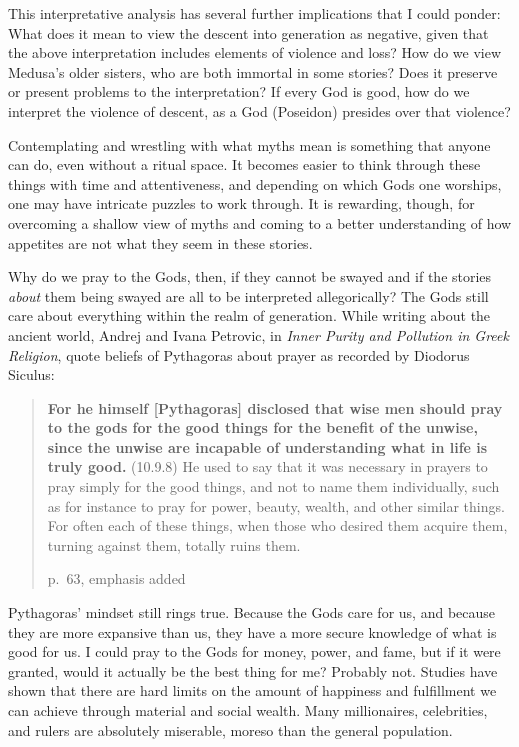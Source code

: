 \documentclass[
]{book}
\begin{document}
This interpretative analysis has several further implications that I could ponder: What does it mean to view the descent into generation as negative, given that the above interpretation includes elements of violence and loss? How do we view Medusa's older sisters, who are both immortal in some stories? Does it preserve or present problems to the interpretation? If every God is good, how do we interpret the violence of descent, as a God (Poseidon) presides over that violence?

Contemplating and wrestling with what myths mean is something that anyone can do, even without a ritual space. It becomes easier to think through these things with time and attentiveness, and depending on which Gods one worships, one may have intricate puzzles to work through. It is rewarding, though, for overcoming a shallow view of myths and coming to a better understanding of how appetites are not what they seem in these stories.

Why do we pray to the Gods, then, if they cannot be swayed and if the stories \emph{about} them being swayed are all to be interpreted allegorically? The Gods still care about everything within the realm of generation. While writing about the ancient world, Andrej and Ivana Petrovic, in \emph{Inner Purity and Pollution in Greek Religion}, quote beliefs of Pythagoras about prayer as recorded by Diodorus Siculus:

\begin{quote}
\textbf{For he himself {[}Pythagoras{]} disclosed that wise men should pray to the gods for the good things for the benefit of the unwise, since the unwise are incapable of understanding what in life is truly good.} (10.9.8) He used to say that it was necessary in prayers to pray simply for the good things, and not to name them individually, such as for instance to pray for power, beauty, wealth, and other similar things. For often each of these things, when those who desired them acquire them, turning against them, totally ruins them.

p.~63, emphasis added
\end{quote}

Pythagoras' mindset still rings true. Because the Gods care for us, and because they are more expansive than us, they have a more secure knowledge of what is good for us. I could pray to the Gods for money, power, and fame, but if it were granted, would it actually be the best thing for me? Probably not. Studies have shown that there are hard limits on the amount of happiness and fulfillment we can achieve through material and social wealth. Many millionaires, celebrities, and rulers are absolutely miserable, moreso than the general population.
\end{document}
